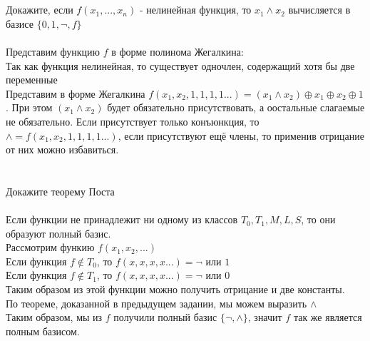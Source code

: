 \documentclass{article}
\begin{document}
\section{}
Докажите, если $f(x_1,...,x_n)$ - нелинейная функция, то $x_1\wedge x_2$ вычисляется в базисе $\{0,1,\lnot,f\}$\\\\
Представим функцию $f$ в форме полинома Жегалкина:\\
Так как функция нелинейная, то существует одночлен, содержащий хотя бы две переменные\\
Представим в форме Жегалкина $f(x_1,x_2,1,1,1,1...) = (x_1\wedge x_2) \oplus x_1 \oplus x_2 \oplus 1$. При этом $(x_1\wedge x_2)$ будет обязательно присутствовать, а оостальные слагаемые не обязательно. Если присутствует только конъюнкция, то $\wedge = f(x_1,x_2,1,1,1,1...)$, если присутствуют ещё члены, то применив отрицание от них можно избавиться.\\
\section{}
Докажите теорему Поста\\\\
Если функции не принадлежит ни одному из классов $T_0, T_1, M, L, S$, то они образуют полный базис.\\
Рассмотрим функию $f(x_1,x_2,...)$\\
Если функция $f \notin T_0$, то $f(x,x,x,x...)=\lnot$ или $1$\\
Если функция $f \notin T_1$, то $f(x,x,x,x...)=\lnot$ или $0$\\
Таким образом из этой функции можно получить отрицание и две константы.\\
По теореме, доказанной в предыдущем задании, мы можем выразить $\wedge$\\
Таким образом, мы из $f$ получили полный базис $\{\lnot, \wedge\}$, значит $f$ так же является полным базисом.
\end{document}
